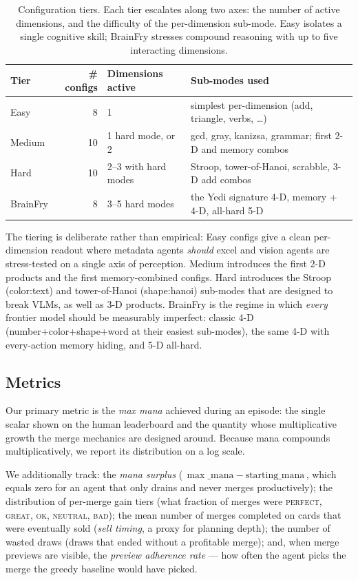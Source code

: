 \documentclass[11pt]{article}
\begin{document}
\begin{table}[h]
\centering
\small
\begin{tabular}{@{}lrll@{}}
\toprule
\textbf{Tier} & \textbf{\# configs} & \textbf{Dimensions active} & \textbf{Sub-modes used} \\
\midrule
Easy      & 8  & 1                     & simplest per-dimension (add, triangle, verbs, \ldots) \\
Medium    & 10 & 1 hard mode, or 2 & gcd, gray, kanizsa, grammar; first 2-D and memory combos \\
Hard      & 10 & 2--3 with hard modes  & Stroop, tower-of-Hanoi, scrabble, 3-D add combos \\
BrainFry  & 8  & 3--5 hard modes       & the Yedi signature 4-D, memory + 4-D, all-hard 5-D \\
\bottomrule
\end{tabular}
\caption{Configuration tiers. Each tier escalates along two axes: the
number of active dimensions, and the difficulty of the per-dimension
sub-mode. Easy isolates a single cognitive skill; BrainFry stresses
compound reasoning with up to five interacting dimensions.}
\label{tab:config-summary}
\end{table}

The tiering is deliberate rather than empirical: Easy configs give a clean
per-dimension readout where metadata agents \emph{should} excel and vision
agents are stress-tested on a single axis of perception. Medium introduces
the first 2-D products and the first memory-combined configs. Hard
introduces the Stroop (color:text) and tower-of-Hanoi (shape:hanoi)
sub-modes that are designed to break VLMs, as well as 3-D products.
BrainFry is the regime in which \emph{every} frontier model should be
measurably imperfect: classic 4-D (number+color+shape+word at their easiest
sub-modes), the same 4-D with every-action memory hiding, and 5-D
all-hard.

\subsection{Metrics}
\label{sec:metrics}

Our primary metric is the \emph{max mana} achieved during an episode: the
single scalar shown on the human leaderboard and the quantity whose
multiplicative growth the merge mechanics are designed around. Because mana
compounds multiplicatively, we report its distribution on a log scale.

We additionally track: the \emph{mana surplus}
(\,$\max\_\text{mana} - \text{starting\_mana}$\,, which equals zero for an
agent that only drains and never merges productively); the distribution of
per-merge gain tiers (what fraction of merges were \textsc{perfect},
\textsc{great}, \textsc{ok}, \textsc{neutral}, \textsc{bad}); the mean
number of merges completed on cards that were eventually sold
(\emph{sell timing}, a proxy for planning depth); the number of wasted
draws (draws that ended without a profitable merge); and, when merge
previews are visible, the \emph{preview adherence rate} --- how often the
agent picks the merge the greedy baseline would have picked.
\end{document}
